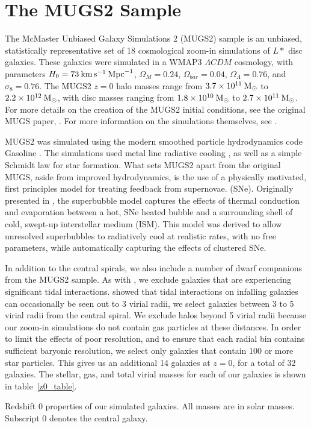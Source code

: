 \section{The MUGS2 Sample}
The McMaster Unbiased Galaxy Simulations 2 (MUGS2) sample is an unbiased,
statistically representative set of 18 cosmological zoom-in simulations of $L*$
disc galaxies.  These galaxies were simulated in a {\sc WMAP3} $\Lambda CDM$
cosmology, with parameters $H_0 = 73\>{\rm km}\,{\rm s}^{-1} \>{\rm Mpc}^{-1}$, $\Omega_M=0.24$,
$\Omega_{bar}=0.04$, $\Omega_\Lambda=0.76$, and $\sigma_8=0.76$.  The MUGS2
$z=0$ halo masses range from $3.7\times10^{11}\>{\rm M_{\odot}}$ to $2.2\times10^{12}\>{\rm M_{\odot}}$,
with disc masses ranging from $1.8\times10^{10}\>{\rm M_{\odot}}$ to
$2.7\times10^{11}\>{\rm M_{\odot}}$.  For more details on the creation of the MUGS2 initial
conditions, see the original MUGS paper, \citet{Stinson2010}.  For more
information on the simulations themselves, see \citet{Keller2015,Keller2016a}.

MUGS2 was simulated using the modern smoothed particle hydrodynamics code {\sc
Gasoline} \citep{Wadsley2004,Keller2014}.  The simulations used metal line
radiative cooling \citep{Shen2010}, as well as a simple Schmidt law for star
formation.  What sets MUGS2 apart from the original MUGS, aside from improved
hydrodynamics, is the use of a physically motivated, first principles model for
treating feedback from supernovae. (SNe).  Originally presented in
\citet{Keller2014}, the superbubble model captures the effects of thermal
conduction and evaporation between a hot, SNe heated bubble and a surrounding
shell of cold, swept-up interstellar medium (ISM).  This model was derived to allow unresolved
superbubbles to radiatively cool at realistic rates, with no free parameters,
while automatically capturing the effects of clustered SNe.

In addition to the central spirals, we also include a number of dwarf companions
from the MUGS2 sample.  As with \citet{McGaugh2016}, we exclude galaxies that
are experiencing significant tidal interactions.  \citet{Joshi2016} showed that
tidal interactions on infalling galaxies can occasionally be seen out to 3
virial radii, we select galaxies between 3 to 5 virial radii from the central
spiral. We exclude halos beyond 5 virial radii because our zoom-in simulations
do not contain gas particles at these distances. In order to limit the effects
of poor resolution, and to ensure that each radial bin contains sufficient
baryonic resolution, we select only galaxies that contain 100 or more star
particles.  This gives us an additional 14 galaxies at $z=0$, for a total of
32 galaxies.  The stellar, gas, and total virial masses for each of our galaxies
is shown in table~\ref{z0_table}.
\begin{table}

\caption{Redshift 0 properties of our simulated galaxies.  All masses are in
    solar masses. Subscript 0 denotes the central galaxy.}
\label{z0_table}
\end{table}

